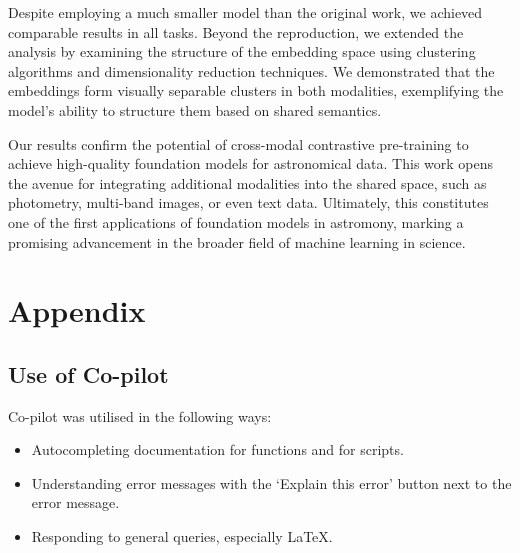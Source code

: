 \documentclass[a4paper,12pt]{article}
\begin{document}
Despite employing a much smaller model than the original work, we achieved comparable results in all tasks. Beyond the reproduction, we extended the analysis by examining the structure of the embedding space using clustering algorithms and dimensionality reduction techniques. We demonstrated that the embeddings form visually separable clusters in both modalities, exemplifying the model's ability to structure them based on shared semantics.

Our results confirm the potential of cross-modal contrastive pre-training to achieve high-quality foundation models for astronomical data. This work opens the avenue for integrating additional modalities into the shared space, such as photometry, multi-band images, or even text data. Ultimately, this constitutes one of the first applications of foundation models in astromony, marking a promising advancement in the broader field of machine learning in science.



\newpage



\newpage
\section*{Appendix}

\subsection*{Use of Co-pilot}
Co-pilot was utilised in the following ways:
\begin{itemize}
    \item Autocompleting documentation for functions and for scripts.
    \item Understanding error messages with the `Explain this error' button next to the error message.
    \item Responding to general queries, especially LaTeX.
\end{itemize}
\end{document}
